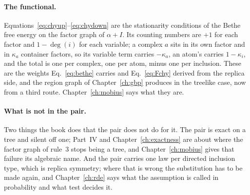\paragraph{The functional.} Equations~\eqref{eq:chyup}--\eqref{eq:chydown}
are the stationarity conditions of the Bethe free energy on the factor graph
of $\alpha+I$. Its counting numbers are $+1$ for each factor and $1-\deg(i)$
for each variable; a complex $a$ sits in its own factor and in $\kappa_{a}$
container factors, so its variable term carries $-\kappa_{a}$, an atom's
carries $1-\kappa_{i}$, and the total is one per complex, one per atom, minus
one per inclusion. These are the weights Eq.~\eqref{eq:bethe} carries and
Eq.~\eqref{eq:Fchy} derived from the replica side, and the region graph of
Chapter~\ref{ch:gbp} produces in the treelike case, now from a third route.
Chapter~\ref{ch:mobius} says what they are.

\paragraph{What is not in the pair.} Two things the book does that the pair
does not do for it. The pair is exact on a tree and silent off one; Part~IV
and Chapter~\ref{ch:exactness} are about where the factor graph of rule~3
stops being a tree, and Chapter~\ref{ch:mobius} gives that failure its
algebraic name. And the pair carries one law per directed inclusion type,
which is replica symmetry; where that is wrong the substitution has to be
made again, and Chapter~\ref{ch:rde} says what the assumption is called in
probability and what test decides it.
